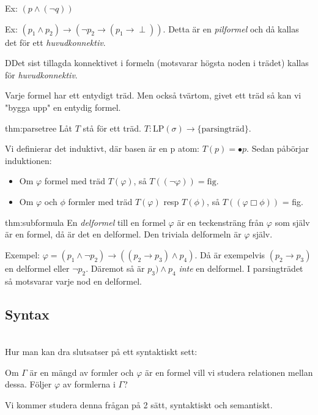 \noindent Ex: $(p\wedge(\neg q))$
\par\bigskip
\noindent Ex: $(p_1\wedge p_2)\rightarrow (\neg p_2\rightarrow (p_1\rightarrow\perp))$. Detta är en \textit{pilformel} och då kallas det för ett \textit{huvudkonnektiv}.
\par\bigskip

\begin{theo}
  DDet sist tillagda konnektivet i formeln (motsvarar högsta noden i trädet) kallas för \textit{huvudkonnektiv}.
\end{theo}
\par\bigskip

\noindent Varje formel har ett entydigt träd. Men också tvärtom, givet ett träd så kan vi "bygga upp" en entydig formel.
\par\bigskip

\begin{theo}[Parsingträd]{thm:parsetree}
  Låt $T$ stå för ett träd. $T:\text{LP}(\sigma)\rightarrow\{\text{parsingträd}\}$.
  \par\bigskip
  Vi definierar det induktivt, där basen är en p atom: $T(p)=\bullet p$. Sedan påbörjar induktionen:

  \begin{itemize}
    \item Om $\varphi$ formel med träd $T(\varphi)$, så $T((\neg\varphi))=\text{fig.}$
    \item Om $\varphi$ och $\phi$ formler med träd $T(\varphi)$ resp $T(\phi)$, så $T((\varphi\Box\phi))$ = fig.
  \end{itemize}
\end{theo}
\par\bigskip

\begin{theo}[Delformel]{thm:subformula}
  En \textit{delformel} till en formel $\varphi$ är en teckensträng från $\varphi$ som själv är en formel, då är det en delformel. Den triviala delformeln är $\varphi$ själv.
\end{theo}
\par\bigskip
\noindent Exempel: $\varphi=(p_1\wedge\neg p_2)\rightarrow((p_2\rightarrow p_3)\wedge p_4)$. Då är exempelvis $(p_2\rightarrow p_3)$ en delformel eller $\neg p_2$. Däremot så är $p_3)\wedge p_4$ \textit{inte} en delformel. I parsingträdet så motsvarar varje nod en delformel.

\subsection{Syntax}\hfill\\
\noindent Hur man kan dra slutsatser på ett syntaktiskt sett:
\par\bigskip
\noindent Om $\Gamma$ är en mängd av formler och $\varphi$ är en formel vill vi studera relationen mellan dessa. Följer $\varphi$ av formlerna i $\Gamma$?
\par\bigskip
\noindent Vi kommer studera denna frågan på 2 sätt, syntaktiskt och semantiskt.

